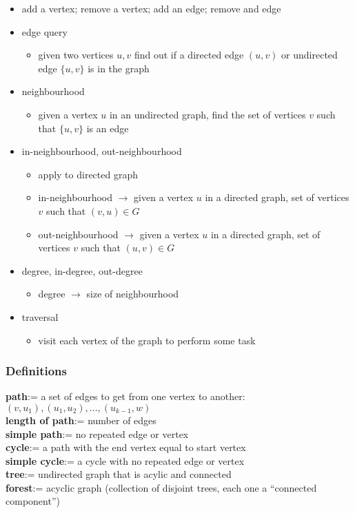 \begin{itemize}
	\item add a vertex; remove a vertex; add an edge; remove and edge
	\item edge query
		\begin{itemize}
			\item given two vertices $u,v$ find out if a directed edge $(u,v)$ or
				undirected edge $\{u,v\}$ is in the graph
		\end{itemize}
	\item neighbourhood
		\begin{itemize}
			\item given a vertex $u$ in an undirected graph, find the set of vertices $v$
				such that $\{u,v\}$ is an edge
		\end{itemize}
	\item in-neighbourhood, out-neighbourhood
		\begin{itemize}
			\item apply to directed graph
			\item in-neighbourhood $\rightarrow$ given a vertex $u$ in a directed graph, set of
				vertices $v$ such that $(v,u) \in G$
			\item out-neighbourhood $\rightarrow$ given a vertex $u$ in a directed graph, set of
				vertices $v$ such that $(u,v) \in G$
		\end{itemize}
	\item degree, in-degree, out-degree
		\begin{itemize}
			\item degree $\rightarrow$ size of neighbourhood
		\end{itemize}
	\item traversal
		\begin{itemize}
			\item visit each vertex of the graph to perform some task
		\end{itemize}
\end{itemize}

\subsubsection*{Definitions}

\noindent \textbf{path}:= a set of edges to get from one vertex to another: $(v,u_1),(u_1,u_2),\ldots,(u_{k-1},w)$ \\
\textbf{length of path}:= number of edges\\
\textbf{simple path}:= no repeated edge or vertex \\
\textbf{cycle}:= a path with the end vertex equal to start vertex\\
\textbf{simple cycle}:= a cycle with no repeated edge or vertex \\
\textbf{tree}:= undirected graph that is acylic and connected \\
\textbf{forest}:= acyclic graph (collection of disjoint trees, each one a ``connected component'')\\

